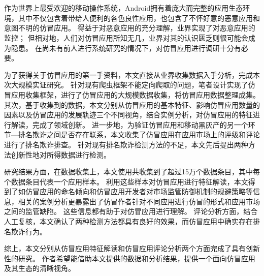 \cleardoublepage{}

\chapter*{}
\vspace{-5mm}

\setlength{\baselineskip}{25pt} %

作为世界上最受欢迎的移动操作系统，Android拥有着庞大而完整的应用生态环境，其中不仅包含着带给人便利的各色良性应用，也包含了不怀好意的恶意应用和意图不明的仿冒应用。
得益于对恶意应用的充分理解，业界实现了对恶意应用的监控；
但相对地，人们对仿冒应用所知无几，业界对其的认识匮乏则很可能会成为隐患。
在尚未有前人进行系统研究的情况下，对仿冒应用进行调研十分有必要。

为了获得关于仿冒应用的第一手资料，本文直接从业界收集数据入手分析，完成本次大规模实证研究。
针对现有爬虫框架不能定向爬取的问题，笔者设计实现了仿冒应用收集框架\mytool ，进行了仿冒应用的大规模数据收集，将仿冒应用数据整理成集。
其次，基于收集到的数据，本文分别从仿冒应用的基本特征、影响仿冒应用数量的因素以及仿冒应用的发展轨迹三个不同视角，结合实例分析，对仿冒应用的特征进行解读，完成了领域创新。
进一步地，为验证仿冒应用和移动黑灰产的另一个环节---排名欺诈之间是否存在联系，本文收集了仿冒应用在应用市场上的评级和评论进行了排名欺诈排查。
针对现有排名欺诈检测方法的不足，本文先后提出两种方法创新性地对所得数据进行检测。

研究结果方面，在数据收集上，本文使用\mytool 共收集到了超过15万个数据条目，其中每个数据条目代表一个应用样本。
利用这些样本对仿冒应用进行特征解读，本文得到了如仿冒应用的命名倾向和仿冒应用开发者对市场监管防御机制的规避策略等信息，相关的案例分析更暴露出了仿冒作者针对不同应用进行仿冒的形式和应用市场之间的监管缺陷。
这些信息都有助于对仿冒应用进行理解。
评论分析方面，结合人工复核，本文确认了两种检测方法都具有良好的效果，而仿冒应用中确实存在排名欺诈行为。

综上，本文分别从仿冒应用特征解读和仿冒应用评论分析两个方面完成了具有创新性的研究。
作者希望能借助本文提供的数据和分析结果，提供一个面向仿冒应用及其生态的清晰视角。

 

